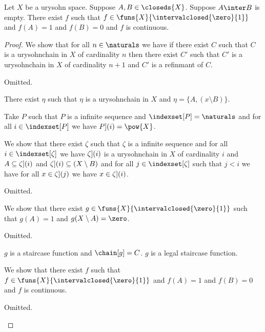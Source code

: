 \begin{theorem}\label{urysohn}
    Let $X$ be a urysohn space.
    Suppose $A,B \in \closeds{X}$.
    Suppose $A \inter B$ is empty.
    There exist $f$ such that $f \in \funs{X}{\intervalclosed{\zero}{1}}$ 
    and $f(A) = 1$ and $f(B)= 0$ and $f$ is continuous.
\end{theorem}
\begin{proof}
    We show that for all $n \in \naturals$ we have
    if there exist $C$ such that $C$ is a urysohnchain in $X$ of cardinality $n$ 
    then there exist $C'$  such that $C'$ is a urysohnchain in $X$ of cardinality $n+1$ 
    and $C'$ is a refinmant of $C$.
    \begin{subproof}
        Omitted.
    \end{subproof}

    There exist $\eta$ such that $\eta$ is a urysohnchain in $X$ and $\eta =\{A, (x \setminus B)\}$.

    

    Take $P$ such that $P$ is a infinite sequence and $\indexset[P] = \naturals$ and for all $i \in \indexset[P]$ we have $\index[P](i) = \pow{X}$.
    
    We show that there exist $\zeta$ such that $\zeta$ is a infinite sequence 
    and for all $i \in \indexset[\zeta]$ we have 
    $\index[\zeta](i)$ is a urysohnchain in $X$ of cardinality $i$
    and $A \subseteq \index[\zeta](i)$
    and $\index[\zeta](i) \subseteq (X \setminus B)$
    and for all $j \in \indexset[\zeta]$ such that 
    $j < i$ we have for all $x \in \index[\zeta](j)$ we have $x \in \index[\zeta](i)$.
    \begin{subproof}
        Omitted.
    \end{subproof}
  
    


    



    We show that there exist $g \in \funs{X}{\intervalclosed{\zero}{1}}$ such that $g(A)=1$ and $g(X\setminus A) = \zero$.
    \begin{subproof}
        Omitted.
    \end{subproof}
    $g$ is a staircase function and $\chain[g] = C$.
    $g$ is a legal staircase function.


    We show that there exist $f$ such that $f \in \funs{X}{\intervalclosed{\zero}{1}}$ 
    and $f(A) = 1$ and $f(B)= 0$ and $f$ is continuous.
    \begin{subproof}
        Omitted.
    \end{subproof}



\end{proof}
